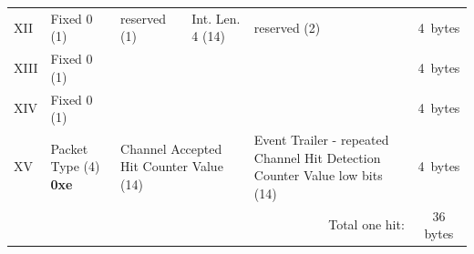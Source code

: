 \documentclass[letterpaper,12pt,notitlepage]{report}
\begin{document}
\begin{landscape}
\begin{table}
\begin{tabular*}{\textwidth}{p{0.9cm}|p{2.25cm}|p{2.2cm}|p{2.2cm}|p{2.2cm}|p{2.2cm}|p{2.2cm}|p{2.2cm}|p{2.2cm}|c}
\cline{2-9}
XII & Fixed 0 (1) & reserved (1) & \multicolumn{2}{p{4.4cm}|}{Int. Len. 4 (14)} & reserved (2) & \multicolumn{3}{p{6.6cm}|}{\centering{Int. Len. 3 (14)}} & 4~bytes\\
\cline{2-9}
XIII & Fixed 0 (1) & \multicolumn{7}{p{15.4cm}|}{\centering{Pulse Height 3 (31)}} & 4~bytes\\
\cline{2-9}
XIV & Fixed 0 (1) & \multicolumn{7}{p{15.4cm}|}{\centering{Pulse Height 4 (31)}} & 4~bytes\\
\cline{2-9}
XV & Packet Type (4) {\bf 0xe} & \multicolumn{3}{p{6.6cm}|}{Channel Accepted Hit Counter Value (14)} & \multicolumn{4}{p{8.8cm}|}{Event Trailer - repeated Channel Hit Detection Counter Value low bits (14)} & 4~bytes\\
\cline{2-9}
\multicolumn{9}{r}{Total one hit:} & 36 bytes\\
\end{tabular*}
\end{table}
\end{landscape}
\end{document}

